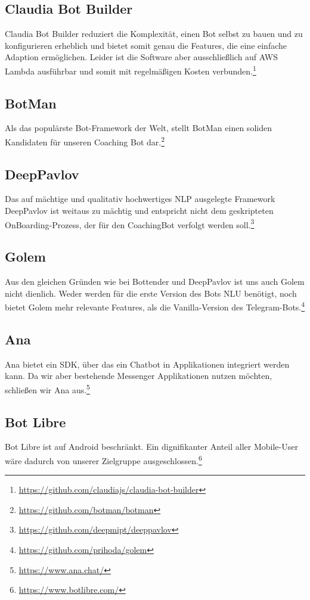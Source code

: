     \subsection{Claudia Bot Builder} 
        Claudia Bot Builder reduziert die Komplexität, einen Bot selbst zu bauen und zu konfigurieren erheblich und bietet somit genau die Features, die eine einfache Adaption ermöglichen. Leider ist die Software aber ausschließlich auf AWS Lambda ausführbar und somit mit regelmäßigen Kosten verbunden.\footnote{\url{https://github.com/claudiajs/claudia-bot-builder}}

    \subsection{BotMan} \label{BotMan}
        Als das populärste Bot-Framework der Welt, stellt BotMan einen soliden Kandidaten für unseren Coaching Bot dar.\footnote{\url{https://github.com/botman/botman}}

    \subsection{DeepPavlov} 
        Das auf mächtige und qualitativ hochwertiges NLP ausgelegte Framework DeepPavlov ist weitaus zu mächtig und entspricht nicht dem geskripteten OnBoarding-Prozess, der für den CoachingBot verfolgt werden soll.\footnote{\url{https://github.com/deepmipt/deeppavlov}}
        
    \subsection{Golem} 
        Aus den gleichen Gründen wie bei Bottender und DeepPavlov ist uns auch Golem nicht dienlich. Weder werden für die erste Version des Bots NLU benötigt, noch bietet Golem mehr relevante Features, als die Vanilla-Version des Telegram-Bots.\footnote{\url{https://github.com/prihoda/golem}}
        
    \subsection{Ana} 
        Ana bietet ein SDK, über das ein Chatbot in Applikationen integriert werden kann. Da wir aber bestehende Messenger Applikationen nutzen möchten, schließen wir Ana aus.\footnote{\url{https://www.ana.chat/}}
        
    \subsection{Bot Libre} 
        Bot Libre ist auf Android beschränkt. Ein dignifikanter Anteil aller Mobile-User wäre dadurch von unserer Zielgruppe ausgeschlossen.\footnote{\url{https://www.botlibre.com/}} 
        
